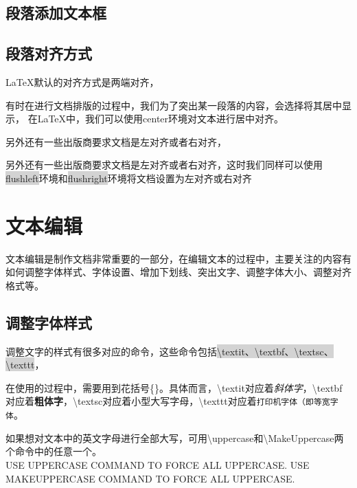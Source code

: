 \documentclass[a4paper,twoside,12pt]{article}
\begin{document}
\subsection{段落添加文本框}

\subsection{段落对齐方式}
\LaTeX 默认的对齐方式是两端对齐，
\begin{center}
    有时在进行文档排版的过程中，我们为了突出某一段落的内容，会选择将其居中显示，
    在LaTeX中，我们可以使用center环境对文本进行居中对齐。
\end{center}
\begin{flushright}
    另外还有一些出版商要求文档是左对齐或者右对齐，
\end{flushright}
\begin{flushleft}
    另外还有一些出版商要求文档是左对齐或者右对齐，这时我们同样可以使用\colorbox{lightgray}{flushleft}环境和\colorbox{lightgray}{flushright}环境将文档设置为左对齐或右对齐
\end{flushleft}

\section{文本编辑}
文本编辑是制作文档非常重要的一部分，在编辑文本的过程中，主要关注的内容有如何调整字体样式、字体设置、增加下划线、突出文字、调整字体大小、调整对齐格式等。
\subsection{调整字体样式}
调整文字的样式有很多对应的命令，这些命令包括\colorbox{lightgray}{\textbackslash textit、\textbackslash textbf、\textbackslash textsc、\\ \textbackslash texttt}，

在使用的过程中，需要用到花括号\{\}。具体而言，\textbackslash textit对应着\textit{斜体字}，\textbackslash textbf对应着\textbf{粗体字}，\textbackslash textsc对应着\textsc{小型大写字母}，\textbackslash texttt对应着\texttt{打印机字体（即等宽字体}。

如果想对文本中的英文字母进行全部大写，可用\textbackslash uppercase和\textbackslash MakeUppercase两个命令中的任意一个。 \\
\uppercase{Use uppercase command to force all uppercase.}
\MakeUppercase{Use MakeUppercase command to force all uppercase.}
\end{document}
